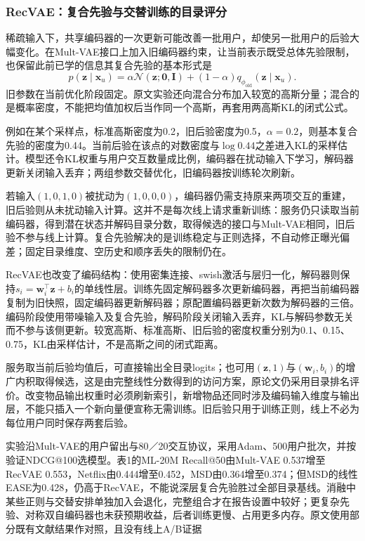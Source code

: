 \subsubsection{RecVAE：复合先验与交替训练的目录评分}
\label{sec:rs-recvae}

稀疏输入下，共享编码器的一次更新可能改善一批用户，却使另一批用户的后验大幅变化。在Mult-VAE接口上加入旧编码器约束，让当前表示既受总体先验限制，也保留此前已学的信息其复合先验的基本形式是
\begin{equation}
 p(\bm z\mid\bm x_u)=
 \alpha\mathcal N(\bm z;\bm0,\bm I)
 +(1-\alpha)q_{\phi_{\mathrm{old}}}(\bm z\mid\bm x_u).
 \label{eq:rs-recvae-prior}
\end{equation}
旧参数在当前优化阶段固定。原文实验还向混合分布加入较宽的高斯分量；混合的是概率密度，不能把均值加权后当作同一个高斯，再套用两高斯KL的闭式公式。

例如在某个采样点，标准高斯密度为0.2，旧后验密度为0.5，$\alpha=0.2$，则基本复合先验的密度为0.44。当前后验在该点的对数密度与$\log0.44$之差进入KL的采样估计。模型还令KL权重与用户交互数量成比例，编码器在扰动输入下学习，解码器更新关闭输入丢弃；两组参数交替优化，旧编码器按训练轮次刷新。

若输入$(1,0,1,0)$被扰动为$(1,0,0,0)$，编码器仍需支持原来两项交互的重建，旧后验则从未扰动输入计算。这并不是每次线上请求重新训练：服务仍只读取当前编码器，得到潜在状态并解码目录分数，取得候选的接口与Mult-VAE相同，旧后验不参与线上计算。复合先验解决的是训练稳定与正则选择，不自动修正曝光偏差；固定目录维度、空历史和顺序丢失的限制仍在。

RecVAE也改变了编码结构：使用密集连接、swish激活与层归一化，解码器则保持$s_i=\bm w_i^\top\bm z+b_i$的单线性层。训练先固定解码器多次更新编码器，再把当前编码器复制为旧快照，固定编码器更新解码器；原配置编码器更新次数为解码器的三倍。编码阶段使用带噪输入及复合先验，解码阶段关闭输入丢弃，KL与解码参数无关而不参与该侧更新。较宽高斯、标准高斯、旧后验的密度权重分别为0.1、0.15、0.75，KL由采样估计，不是高斯之间的闭式距离。

服务取当前后验均值后，可直接输出全目录logits；也可用$(\bm z,1)$与$(\bm w_i,b_i)$的增广内积取得候选，这是由完整线性分数得到的访问方案，原论文仍采用目录排名评价。改变物品输出权重时必须刷新索引，新增物品还同时涉及编码输入维度与输出层，不能只插入一个新向量便宣称无需训练。旧后验只用于训练正则，线上不必为每位用户同时保存两套后验。

实验沿Mult-VAE的用户留出与80／20交互协议，采用Adam、500用户批次，并按验证NDCG@100选模型。表1的ML-20M Recall@50由Mult-VAE 0.537增至RecVAE 0.553，Netflix由0.444增至0.452，MSD由0.364增至0.374；但MSD的线性EASE为0.428，仍高于RecVAE，不能说深层复合先验胜过全部目录基线。消融中某些正则与交替安排单独加入会退化，完整组合才在报告设置中较好；更复杂先验、对称双自编码器也未获预期收益，后者训练更慢、占用更多内存。原文使用部分既有文献结果作对照，且没有线上A/B证据

